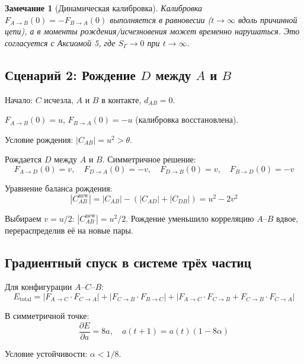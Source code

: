 \documentclass[11pt,a4paper]{article}
\newtheorem{remark}{Замечание}[section]
\theoremstyle{definition}
\begin{document}
\begin{remark}[Динамическая калибровка]
Калибровка $F_{A \to B}(0) = -F_{B \to A}(0)$ выполняется в равновесии ($t \to \infty$ вдоль причинной цепи), а в моменты рождения/исчезновения может временно нарушаться. Это согласуется с Аксиомой 5, где $S_\Gamma \to 0$ при $t \to \infty$.
\end{remark}

\subsection{Сценарий 2: Рождение $D$ между $A$ и $B$}

Начало: $C$ исчезла, $A$ и $B$ в контакте, $d_{AB} = 0$.

$F_{A \to B}(0) = u$, $F_{B \to A}(0) = -u$ (калибровка восстановлена).

Условие рождения: $|C_{AB}| = u^2 > \theta$.

Рождается $D$ между $A$ и $B$. Симметричное решение:
\begin{equation}
    F_{A \to D}(0) = v, \quad F_{D \to A}(0) = -v, \quad F_{D \to B}(0) = v, \quad F_{B \to D}(0) = -v
\end{equation}

Уравнение баланса рождения:
\begin{equation}
    |C_{AB}^{\text{new}}| = |C_{AB}| - (|C_{AD}| + |C_{DB}|) = u^2 - 2v^2
\end{equation}

Выбираем $v = u/2$: $|C_{AB}^{\text{new}}| = u^2/2$. Рождение уменьшило корреляцию $A$--$B$ вдвое, перераспределив её на новые пары.

\subsection{Градиентный спуск в системе трёх частиц}

Для конфигурации $A$--$C$--$B$:
\begin{equation}
    E_{\text{total}} = |F_{A \to C} \cdot F_{C \to A}| + |F_{C \to B} \cdot F_{B \to C}| + |F_{A \to C} \cdot F_{C \to B} + F_{C \to B} \cdot F_{C \to A}|
\end{equation}

В симметричной точке:
\begin{equation}
    \frac{\partial E}{\partial a} = 8a, \quad a(t+1) = a(t)(1 - 8\alpha)
\end{equation}

Условие устойчивости: $\alpha < 1/8$.
\end{document}
